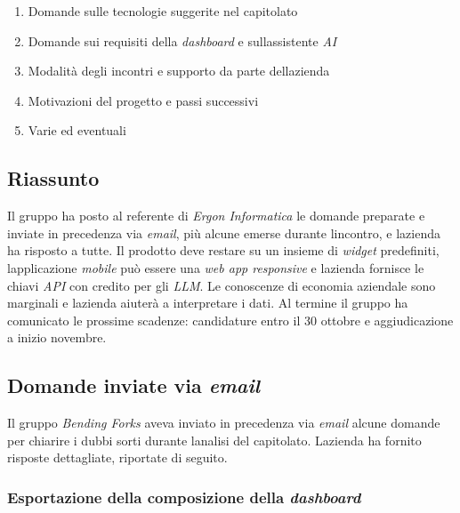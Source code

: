 \documentclass[12pt,a4paper]{article}
\newcommand{\tightlist}{\setlength{\itemsep}{1pt}\setlength{\parskip}{0pt}}
\begin{document}
\begin{enumerate}
\def\labelenumi{\arabic{enumi}.}
\tightlist
\item
  Domande sulle tecnologie suggerite nel capitolato
\item
  Domande sui requisiti della \emph{dashboard} e sull\textquotesingle assistente \emph{AI}
\item
  Modalità degli incontri e supporto da parte dell\textquotesingle azienda
\item
  Motivazioni del progetto e passi successivi
\item
  Varie ed eventuali
\end{enumerate}

\hypertarget{riassunto}{%
\subsection{Riassunto}}

Il gruppo ha posto al referente di \emph{Ergon Informatica} le domande preparate e inviate in precedenza via \emph{email}, più alcune emerse durante l\textquotesingle incontro, e l\textquotesingle azienda ha risposto a tutte. Il prodotto deve restare su un insieme di \emph{widget} predefiniti, l\textquotesingle applicazione \emph{mobile} può essere una \emph{web app responsive} e l\textquotesingle azienda fornisce le chiavi \emph{API} con credito per gli \emph{LLM}. Le conoscenze di economia aziendale sono marginali e l\textquotesingle azienda aiuterà a interpretare i dati. Al termine il gruppo ha comunicato le prossime scadenze: candidature entro il 30 ottobre e aggiudicazione a inizio novembre.

\hypertarget{domande-inviate-via-email}{%
\subsection{\texorpdfstring{Domande inviate via \emph{email}}{Domande inviate via email}}}

Il gruppo \emph{Bending Forks} aveva inviato in precedenza via \emph{email} alcune domande per chiarire i dubbi sorti durante l\textquotesingle analisi del capitolato. L\textquotesingle azienda ha fornito risposte dettagliate, riportate di seguito.

\hypertarget{esportazione-della-composizione-della-dashboard}{%
\subsubsection{\texorpdfstring{Esportazione della composizione della \emph{dashboard}}{Esportazione della composizione della dashboard}}}
\end{document}
